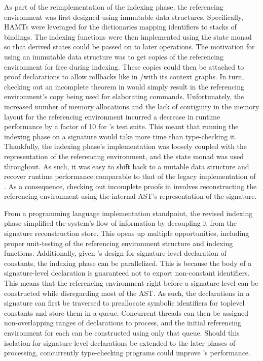 As part of the reimplementation of the indexing phase, the referencing environment was first designed using immutable data structures.
Specifically, \acp{HAMT} were leveraged for the dictionaries mapping identifiers to stacks of bindings.
The indexing functions were then implemented using the state monad so that derived states could be passed on to later operations.
The motivation for using an immutable data structure was to get copies of the referencing environment for free during indexing.
These copies could then be attached to proof declarations to allow rollbacks like in \Isabelle/\Isar with its context graphs.
In turn, checking out an incomplete theorem in \Harpoon would simply result in the referencing environment's copy being used for elaborating commands.
Unfortunately, the increased number of memory allocations and the lack of contiguity in the memory layout for the referencing environment incurred a decrease in runtime performance by a factor of 10 for \Beluga's test suite.
This meant that running the indexing phase on a signature would take more time than type-checking it.
Thankfully, the indexing phase's implementation was loosely coupled with the representation of the referencing environment, and the state monad was used throughout.
As such, it was easy to shift back to a mutable data structure and recover runtime performance comparable to that of the legacy implementation of \Beluga.
As a consequence, checking out incomplete proofs in \Harpoon involves reconstructing the referencing environment using the internal \ac{AST}'s representation of the signature.

From a programming language implementation standpoint, the revised indexing phase simplified the system's flow of information by decoupling it from the signature reconstruction store.
This opens up multiple opportunities, including proper unit-testing of the referencing environment structure and indexing functions.
Additionally, given \Beluga's design for signature-level declaration of constants, the indexing phase can be parallelized.
This is because the body of a signature-level declaration is guaranteed not to export non-constant identifiers.
This means that the referencing environment right before a signature-level can be constructed while disregarding most of the \ac{AST}.
As such, the declarations in a signature can first be traversed to preallocate symbolic identifiers for toplevel constants and store them in a queue.
Concurrent threads can then be assigned non-overlapping ranges of declarations to process, and the initial referencing environment for each can be constructed using only that queue.
Should this isolation for signature-level declarations be extended to the later phases of processing, concurrently type-checking programs could improve \Beluga's performance.
